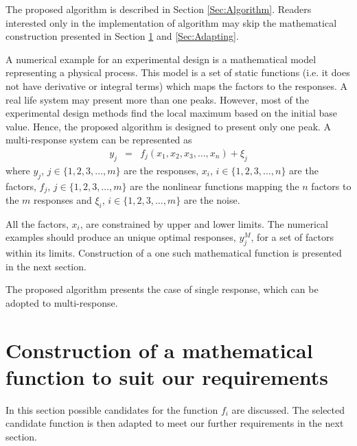 \documentclass[twocolumn]{svjour3}          %
\begin{document}
\par
The proposed algorithm is described in Section \ref{Sec:Algorithm}. Readers interested only in the implementation of algorithm may skip the mathematical construction presented in Section \ref{Sec:Construction} and \ref{Sec:Adapting}.
\par
A numerical example for an experimental design is a mathematical model representing a physical process. This model is a set of static functions (i.e. it does not have derivative or integral terms) which maps the factors to the responses. A real life system may present more than one peaks. However, most of the experimental design methods find the local maximum based on the initial base value. Hence, the proposed algorithm is designed to present only one peak. A multi-response system can be represented as %
\begin{eqnarray}
y_j &=& f_j(x_1, x_2, x_3, \dots, x_n) + \xi_j \label{Eqn:Function}
\end{eqnarray}
\noindent where $y_j$, $j\in \{1,2,3, \dots, m\}$ are the responses, $x_i$, $i\in \{1,2,3, \dots, n\}$ are the factors, $f_j$, $j\in \{1,2,3, \dots, m\}$ are the nonlinear functions mapping the $n$ factors to the $m$ responses and $\xi_i$, $i\in \{1,2,3, \dots, m\}$ are the noise.
\par
All the factors, $x_i$, are constrained by upper and lower limits. The numerical examples should produce an unique optimal responses, $y_j^M$, for a set of factors within its limits. Construction of a one such mathematical function is presented in the next section.
\par
The proposed algorithm presents the case of single response, which can be adopted to multi-response.
\section{Construction of a mathematical function to suit our requirements}
\label{Sec:Construction}
In this section possible candidates for the function $f_i$  are discussed. The selected candidate function is then adapted to meet our further requirements in the next section.
\end{document}
